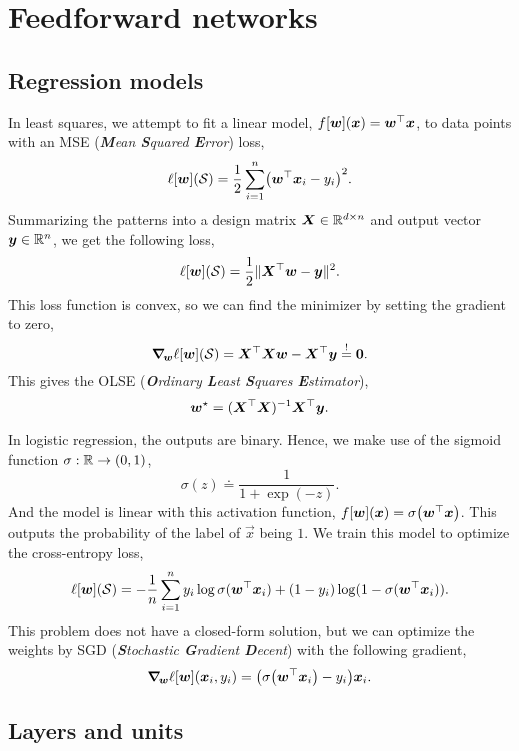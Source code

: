\section{Feedforward networks}

\subsection{Regression models}

In least squares, we attempt to fit a linear model, $f[\vec{w}](\vec{x}) =
    \transpose{\vec{w}}\vec{x}$, to data points with an MSE (\textit{\textbf{M}ean \textbf{S}quared
    \textbf{E}rror}) loss, \[
    \ell[\vec{w}](\mathcal{S}) = \frac{1}{2} \sum_{i=1}^{n} \lft( \transpose{\vec{w}} \vec{x}_i - y_i \rgt)^2.
\]
Summarizing the patterns into a design matrix $\mat{X} \in \R^{d \times n}$ and output vector
$\vec{y} \in \R^n$, we get the following loss, \[
    \ell[\vec{w}](\mathcal{S}) = \frac{1}{2} \| \transpose{\mat{X}} \vec{w} - \vec{y} \|^2.
\]
This loss function is convex, so we can find the minimizer by setting the gradient to zero, \[
    \grad{\ell[\vec{w}](\mathcal{S})}{\vec{w}} = \transpose{\mat{X}} \mat{X} \vec{w} - \transpose{\mat{X}} \vec{y} \condeq \vec{0}.
\]
This gives the OLSE (\textit{\textbf{O}rdinary \textbf{L}east \textbf{S}quares
    \textbf{E}stimator}), \[
    \vec{w}^\star = \inv{(\transpose{\mat{X}} \mat{X})} \transpose{\mat{X}} \vec{y}.
\]

In logistic regression, the outputs are binary. Hence, we make use of the sigmoid function $\sigma:
    \R \to (0,1)$, \[
    \sigma(z) \doteq \frac{1}{1 + \exp(-z)}.
\]
And the model is linear with this activation function, $f[\vec{w}](\vec{x}) = \sigma \lft(
    \transpose{\vec{w}}\vec{x} \rgt)$. This outputs the probability of the label of $\vec{x}$ being
$1$. We train this model to optimize the cross-entropy loss, \[
    \ell[\vec{w}](\mathcal{S}) = -\frac{1}{n} \sum_{i=1}^{n} y_i \log \sigma(\transpose{\vec{w}} \vec{x}_i) + (1-y_i) \log (1-\sigma(\transpose{\vec{w}} \vec{x}_i)).
\]
This problem does not have a closed-form solution, but we can optimize the weights by SGD
(\textit{\textbf{S}tochastic \textbf{G}radient \textbf{D}ecent}) with the following gradient, \[
    \grad{\ell[\vec{w}](\vec{x}_i, y_i)}{\vec{w}} = \lft( \sigma \lft( \transpose{\vec{w}} \vec{x}_i \rgt) - y_i \rgt) \vec{x}_i.
\]

\subsection{Layers and units}

